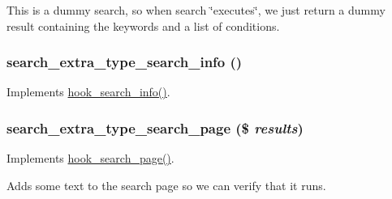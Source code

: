 This is a dummy search, so when search \char`\"{}executes\char`\"{}, we just return a dummy result containing the keywords and a list of conditions. \hypertarget{search__extra__type_8module_aa9c6c6c236d1bd8a965567c760da729b}{
\subsubsection[{search\_\-extra\_\-type\_\-search\_\-info}]{\setlength{\rightskip}{0pt plus 5cm}search\_\-extra\_\-type\_\-search\_\-info ()}}
\label{search__extra__type_8module_aa9c6c6c236d1bd8a965567c760da729b}
Implements \hyperlink{group__search_ga37b761616f2cad4796891008f2b374f3}{hook\_\-search\_\-info()}. \hypertarget{search__extra__type_8module_a3d5a2c40c1ed5f0f59b8dad1e82032a2}{
\subsubsection[{search\_\-extra\_\-type\_\-search\_\-page}]{\setlength{\rightskip}{0pt plus 5cm}search\_\-extra\_\-type\_\-search\_\-page (\$ {\em results})}}
\label{search__extra__type_8module_a3d5a2c40c1ed5f0f59b8dad1e82032a2}
Implements \hyperlink{group__hooks_ga422b9506b3dfd8ed5aa8bfaea98844b9}{hook\_\-search\_\-page()}.

Adds some text to the search page so we can verify that it runs. 